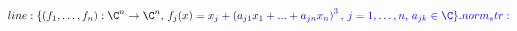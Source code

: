 \documentclass[12pt]{article}
\begin{document}
\makeatletter
\renewcommand*{\@textcolor}[3]{%
  \protect\leavevmode
  \begingroup
    \color#1{#2}#3%
  \endgroup
}
\makeatother
\begin{displaymath}
\mathcolor[RGB]{0,0,15}{line:
\{(f_1,\ldots,f_n):\C^n\rightarrow\C^n,} \mathcolor[RGB]{0,0,30}{\,f_j(x)} \mathcolor[RGB]{0,0,45}{=} \mathcolor[RGB]{0,0,60}{x_j} \mathcolor[RGB]{0,0,75}{+} \mathcolor[RGB]{0,0,90}{\left(} \mathcolor[RGB]{0,0,105}{a_{j1}x_1} \mathcolor[RGB]{0,0,120}{+} \mathcolor[RGB]{0,0,135}{.} \mathcolor[RGB]{0,0,150}{.} \mathcolor[RGB]{0,0,165}{.} \mathcolor[RGB]{0,0,180}{+} \mathcolor[RGB]{0,0,195}{a_{jn}x_n} \mathcolor[RGB]{0,0,210}{\right)^3,} \, \mathcolor[RGB]{0,0,225}{j=1,\ldots,n,} \, \mathcolor[RGB]{0,0,240}{a_{jk}\in\C\}.

norm_str:}
\end{displaymath}
\end{document}
